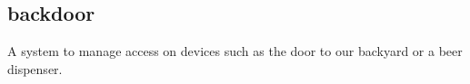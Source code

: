 \documentclass[]{resume}
\begin{document}
\begin{timeline}
\subsection{backdoor}
A system to manage access on devices such as the door to our backyard or a beer dispenser.
\sectionsep

\end{timeline}
\end{document}
